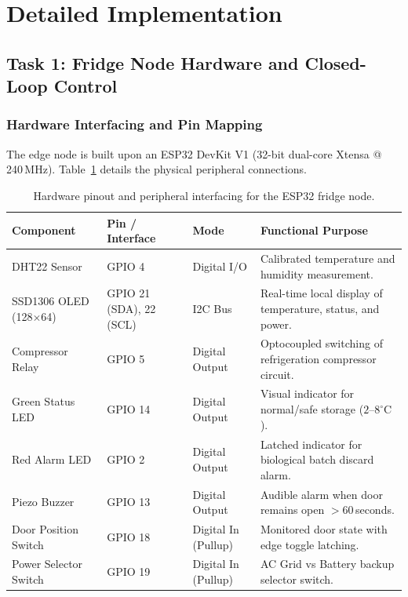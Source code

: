 \documentclass[11pt,a4paper]{article}
\begin{document}
\section{Detailed Implementation}

\subsection{Task 1: Fridge Node Hardware and Closed-Loop Control}

\subsubsection{Hardware Interfacing and Pin Mapping}
The edge node is built upon an ESP32 DevKit V1 (32-bit dual-core Xtensa @ 240\,MHz). Table~\ref{tab:pinout} details the physical peripheral connections.

\begin{table}[h!]
\centering
\small
\renewcommand{\arraystretch}{1.2}
\begin{tabularx}{\textwidth}{l l l X}
\toprule
\textbf{Component} & \textbf{Pin / Interface} & \textbf{Mode} & \textbf{Functional Purpose} \\
\midrule
DHT22 Sensor & GPIO 4 & Digital I/O & Calibrated temperature and humidity measurement. \\
SSD1306 OLED (128$\times$64) & GPIO 21 (SDA), 22 (SCL) & I2C Bus & Real-time local display of temperature, status, and power. \\
Compressor Relay & GPIO 5 & Digital Output & Optocoupled switching of refrigeration compressor circuit. \\
Green Status LED & GPIO 14 & Digital Output & Visual indicator for normal/safe storage ($2$--$8^\circ\text{C}$). \\
Red Alarm LED & GPIO 2 & Digital Output & Latched indicator for biological batch discard alarm. \\
Piezo Buzzer & GPIO 13 & Digital Output & Audible alarm when door remains open $>60$\,seconds. \\
Door Position Switch & GPIO 18 & Digital In (Pullup) & Monitored door state with edge toggle latching. \\
Power Selector Switch & GPIO 19 & Digital In (Pullup) & AC Grid vs Battery backup selector switch. \\
\bottomrule
\end{tabularx}
\caption{Hardware pinout and peripheral interfacing for the ESP32 fridge node.}
\label{tab:pinout}
\end{table}
\end{document}
